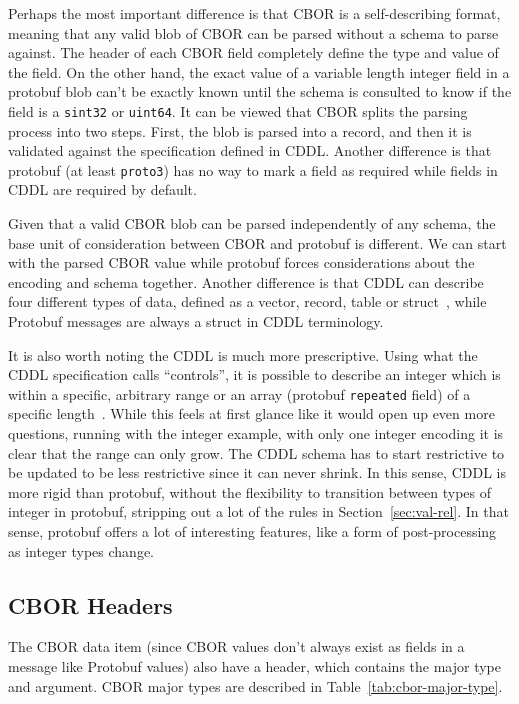 \documentclass[11pt]{article}
\theoremstyle{definition}
\theoremstyle{plain}
\begin{document}
Perhaps the most important difference is that CBOR is a self-describing format,
meaning that any valid blob of CBOR can be parsed without a schema to parse
against. The header of each CBOR field completely define the type and value of the
field. On the other hand, the exact value of a variable length integer field in
a protobuf blob can't be exactly known until the schema is consulted to know if
the field is a \texttt{sint32} or \texttt{uint64}. It can be viewed that CBOR
splits the parsing process into two steps. First, the blob is parsed into a
record, and then it is validated against the specification defined in
CDDL. Another difference is that protobuf (at least \texttt{proto3}) has no way
to mark a field as required while fields in CDDL are required by default.

Given that a valid CBOR blob can be parsed independently of any schema, the base
unit of consideration between CBOR and protobuf is different. We can start with
the parsed CBOR value while protobuf forces considerations about the encoding
and schema together. Another difference is that CDDL can describe four different
types of data, defined as a vector, record, table or
struct~\cite{birkholzConciseDataDefinition2019}, while Protobuf messages are
always a struct in CDDL terminology.

It is also worth noting the CDDL is much more prescriptive. Using what the CDDL
specification calls ``controls'', it is possible to describe an integer which is
within a specific, arbitrary range or an array (protobuf \texttt{repeated}
field) of a specific length~\cite{birkholzConciseDataDefinition2019}. While this
feels at first glance like it would open up even more questions, running with
the integer example, with only one integer encoding it is clear that the range
can only grow. The CDDL schema has to start restrictive to be updated to be less
restrictive since it can never shrink. In this sense, CDDL is more rigid than
protobuf, without the flexibility to transition between types of integer in
protobuf, stripping out a lot of the rules in Section~\ref{sec:val-rel}. In that
sense, protobuf offers a lot of interesting features, like a form of
post-processing as integer types change.

\subsection{CBOR Headers}

The CBOR data item (since CBOR values don't always exist as fields in a message
like Protobuf values) also have a header, which contains the major type and
argument. CBOR major types are described in Table~\ref{tab:cbor-major-type}.
\end{document}
